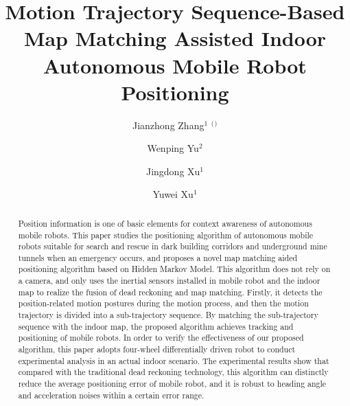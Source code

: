 \documentclass{llncs}
\begin{document}
%
\title{Motion Trajectory Sequence-Based Map Matching Assisted Indoor Autonomous Mobile Robot Positioning}
%

\author{Jianzhong Zhang$^1$ $^($\Envelope$^)$ \and Wenping Yu$^2$ \and Jingdong Xu$^1$ \and Yuwei Xu$^1$}
%
%
%


\maketitle              %

\begin{abstract}

Position information is one of basic elements for context awareness of autonomous mobile robots. This paper studies the positioning algorithm of autonomous mobile robots suitable for search and rescue in dark building corridors and underground mine tunnels when an emergency occurs, and proposes a novel map matching aided positioning algorithm based on Hidden Markov Model. This algorithm does not rely on a camera, and only uses the inertial sensors installed in mobile robot and the indoor map to realize the fusion of dead reckoning and map matching. Firstly, it detects the position-related motion postures during the motion process, and then the motion trajectory is divided into a sub-trajectory sequence. By matching the sub-trajectory sequence with the indoor map, the proposed algorithm achieves tracking and positioning of mobile robots. In order to verify the effectiveness of our proposed algorithm, this paper adopts four-wheel differentially driven robot to conduct experimental analysis in an actual indoor scenario. The experimental results show that compared with the traditional dead reckoning technology, this algorithm can distinctly reduce the average positioning error of mobile robot, and it is robust to heading angle and acceleration noises within a certain error range.

\end{abstract}
%
\end{document}
